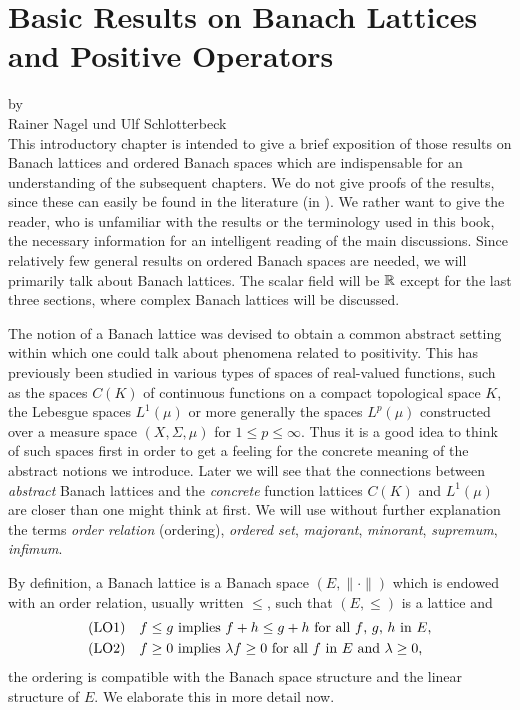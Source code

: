 \chapter{Basic Results on Banach Lattices and Positive Operators}\label{chap:c1}%
{\Large
\vspace*{-.75cm}
by \\[.25em]
Rainer Nagel und Ulf Schlotterbeck
\vspace{.75cm}
\\
}
This introductory chapter is intended to give a brief exposition of those results on Banach lattices and ordered Banach spaces which are indispensable for an understanding of the subsequent chapters.
We do not give proofs of the results, since these can easily be found in the literature (\eg in \citet{schaefer:1974}).
We rather want to give the reader, who is unfamiliar with the results or the terminology used in this book, the necessary information for an intelligent reading of the main discussions.
Since relatively few general results on ordered Banach spaces are needed, we will primarily talk about Banach lattices.
The scalar field will be $\mathbb{R}$ except for the last three sections, where complex Banach lattices will be discussed.

The notion of a Banach lattice was devised to obtain a common abstract setting within which one could talk about phenomena related to positivity.
This has previously been studied in various types of spaces of real-valued functions, such as the spaces $ C(K) $ of continuous functions on a compact topological space $ K $, the Lebesgue spaces $ L^{1}(\mu) $ or more generally the spaces $ L^{p}(\mu) $ constructed over a measure space $ (X,\Sigma,\mu) $ for $ 1 \leq p \leq \infty $.
Thus it is a good idea to think of such spaces first in order to get a feeling for the concrete meaning of the abstract notions we introduce.
Later we will see that the connections between \emph{abstract} Banach lattices and the \emph{concrete} function lattices $ C(K) $ and $ L^{1}(\mu) $ are closer than one might think at first.
We will use without further explanation the terms \emph{order relation} (ordering), \emph{ordered set}, \emph{majorant}, \emph{minorant}, \emph{supremum}, \emph{infimum}.

By definition, a Banach lattice is a Banach space $ (E,\|\cdot\|) $ which is endowed with an order relation, usually written $ \leq $, such that $ (E,\leq) $ is a lattice and 
\begin{align*}
 &\mathrm{(LO1)} \quad \text{$f \leq g$ implies $f + h \leq g + h $
 	 for all $ f $, $ g $, $ h $ in  $ E $,}  \\
 &\mathrm{(LO2)} \quad \text{$f \geq 0$  implies   $\lambda f \geq 0$ for all $ f $ in $ E $ 
 	and  $\lambda \geq 0$,}
\end{align*}
\ie the ordering is compatible with the Banach space structure and the linear structure of $ E $.
We elaborate this in more detail now.


